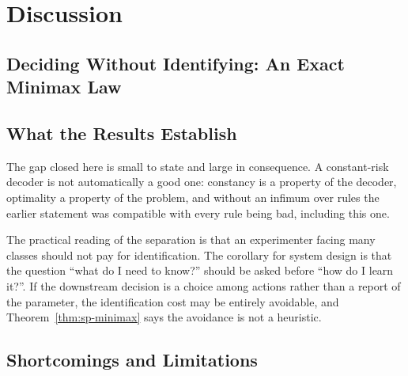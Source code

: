 \section{Discussion}

\subsection{Deciding Without Identifying: An Exact Minimax Law}
\label{sec:sp-discussion}

\subsection{What the Results Establish}

The gap closed here is small to state and large in consequence. A constant-risk decoder is not
automatically a good one: constancy is a property of the decoder, optimality a property of the
problem, and without an infimum over rules the earlier statement was compatible with every
rule being bad, including this one.

The practical reading of the separation is that an experimenter facing many classes should not
pay for identification. The corollary for system design is that the question ``what do I need
to know?'' should be asked before ``how do I learn it?''. If the downstream decision is a
choice among actions rather than a report of the parameter, the identification cost may be
entirely avoidable, and Theorem~\ref{thm:sp-minimax} says the avoidance is not a heuristic.

\subsection{Shortcomings and Limitations}

